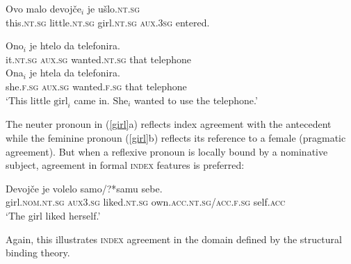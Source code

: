 \documentclass[output=paper]{langsci/langscibook}
\begin{document}
\begin{exe}
\ex \label{girl}
\gll 	Ovo	                      malo                           devoj\v{c}e$_i$         je          u\v{s}lo.\textsc{nt.sg}  \\
         this.\textsc{nt.sg} 	 little.\textsc{nt.sg}   girl.\textsc{nt.sg} 	\textsc{aux.3sg} entered.  \\
\begin{xlist}
\ex  
\gll 	Ono$_i$	je	htelo	da	telefonira. \\
		it.\textsc{nt.sg}  	\textsc{aux.sg}  	wanted.\textsc{nt.sg}  	that	telephone   \\
\ex  
\gll 	Ona$_i$	je	htela	da	telefonira. \\
		she.\textsc{f.sg}  	\textsc{aux.sg}  	wanted.\textsc{f.sg}  	that	telephone \\
\glt `This little $\mbox{girl}_i$ came in.  $\mbox{She}_i$ wanted to use the telephone.'
\end{xlist}
\end{exe}

\noindent
The neuter pronoun in (\ref{girl}a) reflects {\sc index} agreement
with the antecedent while the feminine pronoun (\ref{girl}b) reflects its reference to a female (pragmatic agreement).  But when a reflexive pronoun is locally bound  by a nominative subject, agreement in  formal \textsc{index} features is preferred:

\begin{exe}
\ex \label{girl2}
\gll 	Devoj\v{c}e     je           volelo              samo/?*samu    sebe. \\
        girl.\textsc{nom.nt.sg}   \textsc{aux3.sg}  liked.\textsc{nt.sg} own.\textsc{acc.nt.sg}/\textsc{acc.f.sg}   self.\textsc{acc} \\
\glt `The girl liked herself.'
\end{exe}

\noindent
Again, this illustrates \textsc{index} agreement in the domain defined by the structural binding theory.
\end{document}
